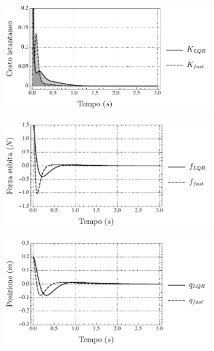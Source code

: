 \begin{figure}
    \centering
    \begin{subfigure}[t]{.48\textwidth}
        \centering
        \includegraphics[width=\textwidth]{assets/nopt1}
    \end{subfigure}
    \hfill
    \begin{subfigure}[t]{.48\textwidth}
        \centering
        \includegraphics[width=\textwidth]{assets/nopt2}
    \end{subfigure}

    \begin{subfigure}[b]{.48\textwidth}
        \centering
        \includegraphics[width=\textwidth]{assets/nopt3}
    \end{subfigure}


\end{figure}
